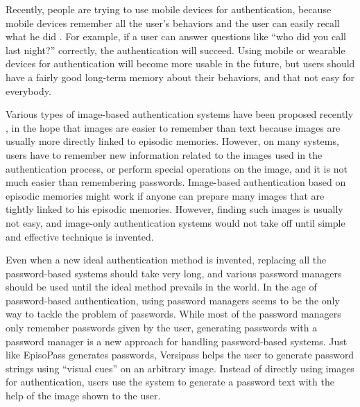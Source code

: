 \documentclass[runningheads,a4paper]{llncs}
\begin{document}
Recently, people are trying to use mobile devices for authentication,
because mobile devices remember all the user's behaviors and
the user can easily recall what he did%
\cite{Dandapat:2015:AYD:2702123.2702457}%
\cite{Das:2013:ECE:2493432.2493453}%
\cite{GuptaWRLGB12}%
.
For example, if a user can answer questions like
``who did you call last night?'' correctly, the authentication will succeed.
Using mobile or wearable devices for authentication will become more usable
in the future,
but users should have a fairly good long-term memory about their behaviors,
and that not easy for everybody.

Various types of image-based authentication systems have been proposed recently%
\cite{Biddle:2012:GPL:2333112.2333114}\cite{GraphicalPasswords},
in the hope that images are easier to remember than text
because images are usually more directly linked to episodic memories.
However, on many systems,
users have to remember new information related to the images
used in the authentication process, or
perform special operations on the image, and
it is not much easier than remembering passwords.
%
Image-based authentication based on episodic memories might work
if anyone can prepare many images 
that are tightly linked to his episodic memories.
However, finding such images is usually not easy, and
image-only authentication systems would not take off
until simple and effective technique is invented.

Even when a new ideal authentication method is invented,
replacing all the password-based systems should take very long, and
various password managers should be used until the ideal method
prevails in the world.
In the age of password-based authentication,
using password managers seems to be the only way to tackle
the problem of passwords.
%
While most of the password managers only remember passwords given by the user,
generating passwords with a password manager is a new approach for
handling password-based systems.
Just like EpisoPass generates passwords,
Versipass\cite{Stobert:2014:PMD:2683467.2683471} %
helps the user to generate password strings
using ``visual cues'' on an arbitrary image.
Instead of directly using images for authentication,
users use the system to generate a password text with the help of
the image shown to the user.

% 
% 
%
\end{document}
